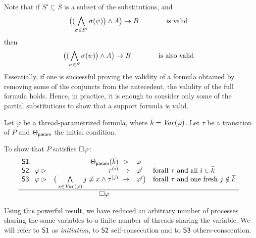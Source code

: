 Note that if $S'\subseteq S$ is a subset of the substitutions, and 
%
  \[ \big( (\bigwedge_{\sigma\in S'} \sigma(\psi)\big) \wedge A\big) \mathrel{\rightarrow} B \hspace{4em} \text{is valid} \]
%
then
%
  \[ \big( (\bigwedge_{\sigma\in S} \sigma(\psi)\big) \wedge A\big) \mathrel{\rightarrow} B \hspace{4em} \text{is also valid} \]
%
  Essentially, if one is successful proving the validity of a formula obtained by removing some of the conjuncts from the antecedent, the validity of the full formula holds.
%
  Hence, in practice, it is enough to consider only some of the partial substitutions to show that a support formula is valid.


\begin{itheorem}
	Let $\varphi$ be a thread-parametrized formula, where $\overline{k}=\mathit{Var}(\varphi)$. 
	Let $\tau$ be a transition of $P$ and $\Theta_{\textsf{param}}$ the initial condition.

	To show that $P$ satisfies $\square\varphi$:
	\hspace{-1em}
	\[ 
		\begin{array}{r@{\;\;}lr@{\;}@{\;}cl@{\hspace{1em}}l}
			\Premise{S1}. & & \ThetaParam(\overline{k}) &\supports & \varphi & \\

			\Premise{S2}. & \varphi \supports & \tau^{(i)} &\Into& \varphi'  & \text{forall $\tau$ and all $i\in \overline{k}$}\\
			\Premise{S3}. & \varphi\supports & \big(\bigwedge\limits_{x\in\Var(\varphi)} j\neq x \andcond \tau^{(j)} &\Into& \varphi' \big)& \text{forall $\tau$ and one fresh $j\notin\overline{k}$}\\ \hline
			& \multicolumn{4}{c}{\hspace{3em} \Always \varphi} &
		\end{array}
	\]
\label{thm:biggest}
\end{itheorem}


Using this powerful result, we have reduced an arbitrary number of processes sharing the same variables to a finite number of threads sharing the variable. 
%
We will refer to $\mathsf{S1}$ as \textit{initiation}, to $\mathsf{S2}$ self-consecution and to $\mathsf{S3}$ others-consecution. 
%

\begin{example}
\end{example}

